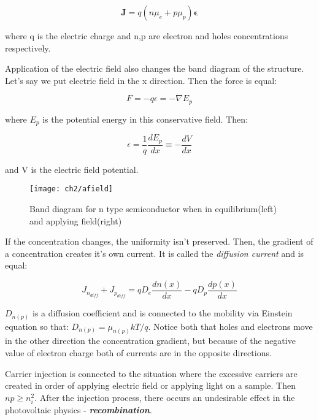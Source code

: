 \begin{equation}
\mathbf{J} = q(n\mu _e + p\mu_p)\mathbf{\epsilon}
\end{equation}

where q is the electric charge and n,p are electron and holes concentrations respectively.

Application of the electric field also changes the band diagram of the structure. Let's say we put electric field in the x direction. Then the force is equal:

\begin{equation}
F = -q\epsilon = -\nabla E_p
\end{equation}

where $E_p$ is the potential energy in this conservative field. Then:

\begin{equation}
\epsilon = \frac{1}{q}\frac{dE_p}{dx} \equiv - \frac{dV}{dx}
\end{equation}

and V is the electric field potential. 

\begin{figure}[H]
\centering
\texttt{[image: ch2/afield]}
\caption{Band diagram for n type semiconductor when in equilibrium(left) and applying field(right)\cite{popko}}
\end{figure}

If the concentration changes, the uniformity isn't preserved. Then, the gradient of a concentration creates it's own current. It is called the \textit{diffusion current} and is equal:

\begin{equation}
J_{n_{diff}} + J_{p_{diff}} = qD_e\frac{dn(x)}{dx}-qD_p\frac{dp(x)}{dx}
\end{equation}

$D_{n(p)}$ is a diffusion coefficient and is connected to the mobility via Einstein equation so that: $D_{n(p)}=\mu _{n(p)} kT/q$. Notice both that holes and electrons move in the other direction the concentration gradient, but because of the negative value of electron charge both of currents are in the opposite directions. 

Carrier injection is connected to the situation where the excessive carriers are created in order of applying electric field or applying light on a sample. Then $np \ge n_i^2$. After the injection process, there occurs an undesirable effect in the photovoltaic physics - \textbf{\textit{recombination}}.


